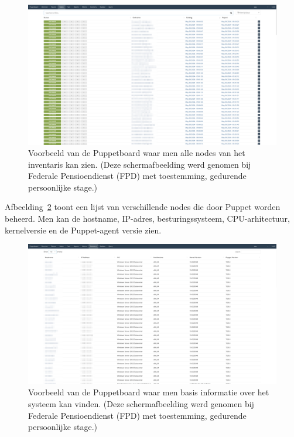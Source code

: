 \begin{figure}[h!]
    \includegraphics[width=\textwidth]
    {./graphics/state-of-the-art/puppetboard/puppetboard-hosts.png}
    \caption[Puppetboard inventaris van nodes.]{\label{fig:puppetboard-inventory}Voorbeeld van de Puppetboard waar men alle nodes van het inventaris kan zien. (Deze schermafbeelding werd genomen bij Federale Pensioendienst (FPD) met toestemming, gedurende persoonlijke stage.)}
\end{figure}

Afbeelding~\ref{fig:puppetboard-example-4} toont een lijst van verschillende nodes die door Puppet worden beheerd.
Men kan de hostname, IP-adres, besturingssysteem, CPU-arhitectuur, kernelversie en de Puppet-agent versie zien.

\begin{figure}[h!]
    \includegraphics[width=\textwidth]
    {./graphics/state-of-the-art/puppetboard/puppetboard-inventory.png}
    \caption[Basisinformatie op Puppetboard.]{\label{fig:puppetboard-example-4}Voorbeeld van de Puppetboard waar men basis informatie over het systeem kan vinden. (Deze schermafbeelding werd genomen bij Federale Pensioendienst (FPD) met toestemming, gedurende persoonlijke stage.)}
\end{figure}
